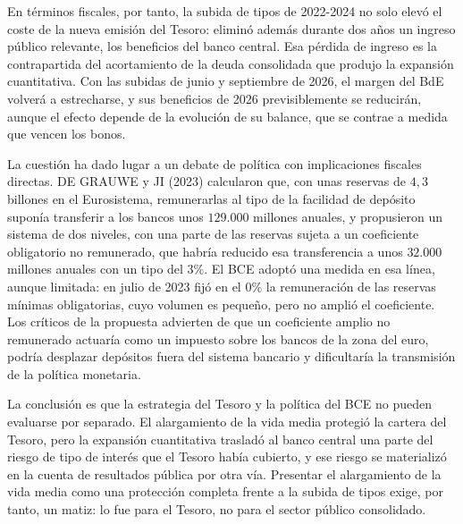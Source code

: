 \documentclass[10pt,a4paper]{article}
\begin{document}
En términos fiscales, por tanto, la subida de tipos de 2022-2024 no solo elevó el coste de la nueva emisión del Tesoro: eliminó además durante dos años un ingreso público relevante, los beneficios del banco central. Esa pérdida de ingreso es la contrapartida del acortamiento de la deuda consolidada que produjo la expansión cuantitativa. Con las subidas de junio y septiembre de 2026, el margen del BdE volverá a estrecharse, y sus beneficios de 2026 previsiblemente se reducirán, aunque el efecto depende de la evolución de su balance, que se contrae a medida que vencen los bonos.

La cuestión ha dado lugar a un debate de política con implicaciones fiscales directas. DE GRAUWE y JI (2023) calcularon que, con unas reservas de $4,3$ billones en el Eurosistema, remunerarlas al tipo de la facilidad de depósito suponía transferir a los bancos unos $129.000$ millones anuales, y propusieron un sistema de dos niveles, con una parte de las reservas sujeta a un coeficiente obligatorio no remunerado, que habría reducido esa transferencia a unos $32.000$ millones anuales con un tipo del $3\%$. El BCE adoptó una medida en esa línea, aunque limitada: en julio de 2023 fijó en el $0\%$ la remuneración de las reservas mínimas obligatorias, cuyo volumen es pequeño, pero no amplió el coeficiente. Los críticos de la propuesta advierten de que un coeficiente amplio no remunerado actuaría como un impuesto sobre los bancos de la zona del euro, podría desplazar depósitos fuera del sistema bancario y dificultaría la transmisión de la política monetaria.

La conclusión es que la estrategia del Tesoro y la política del BCE no pueden evaluarse por separado. El alargamiento de la vida media protegió la cartera del Tesoro, pero la expansión cuantitativa trasladó al banco central una parte del riesgo de tipo de interés que el Tesoro había cubierto, y ese riesgo se materializó en la cuenta de resultados pública por otra vía. Presentar el alargamiento de la vida media como una protección completa frente a la subida de tipos exige, por tanto, un matiz: lo fue para el Tesoro, no para el sector público consolidado.
\end{document}
